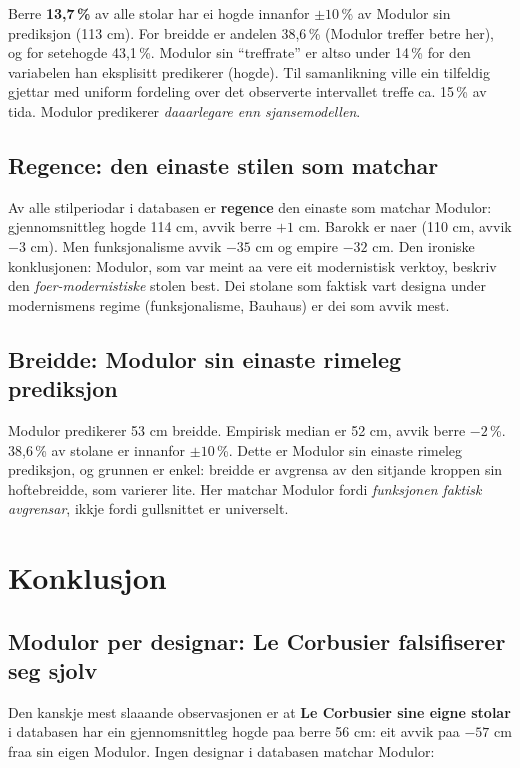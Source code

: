 \documentclass[10pt, a4paper, twocolumn]{article}
\begin{document}
Berre \textbf{13,7\,\%} av alle stolar har ei hogde innanfor $\pm 10$\,\% av Modulor sin prediksjon (113 cm). For breidde er andelen 38,6\,\% (Modulor treffer betre her), og for setehogde 43,1\,\%. Modulor sin ``treffrate'' er altso under 14\,\% for den variabelen han eksplisitt predikerer (hogde). Til samanlikning ville ein tilfeldig gjettar med uniform fordeling over det observerte intervallet treffe ca. 15\,\% av tida. Modulor predikerer \emph{daaarlegare enn sjansemodellen}.

\subsection{Regence: den einaste stilen som matchar}

Av alle stilperiodar i databasen er \textbf{regence} den einaste som matchar Modulor: gjennomsnittleg hogde 114 cm, avvik berre $+1$ cm. Barokk er naer (110 cm, avvik $-3$ cm). Men funksjonalisme avvik $-35$ cm og empire $-32$ cm. Den ironiske konklusjonen: Modulor, som var meint aa vere eit modernistisk verktoy, beskriv den \emph{foer-modernistiske} stolen best. Dei stolane som faktisk vart designa under modernismens regime (funksjonalisme, Bauhaus) er dei som avvik mest.

\subsection{Breidde: Modulor sin einaste rimeleg prediksjon}

Modulor predikerer 53 cm breidde. Empirisk median er 52 cm, avvik berre $-2$\,\%. 38,6\,\% av stolane er innanfor $\pm 10$\,\%. Dette er Modulor sin einaste rimeleg prediksjon, og grunnen er enkel: breidde er avgrensa av den sitjande kroppen sin hoftebreidde, som varierer lite. Her matchar Modulor fordi \emph{funksjonen faktisk avgrensar}, ikkje fordi gullsnittet er universelt.


\section{Konklusjon}

\subsection{Modulor per designar: Le Corbusier falsifiserer seg sjolv}

Den kanskje mest slaaande observasjonen er at \textbf{Le Corbusier sine eigne stolar} i databasen har ein gjennomsnittleg hogde paa berre 56 cm: eit avvik paa $-57$ cm fraa sin eigen Modulor. Ingen designar i databasen matchar Modulor:
\end{document}
